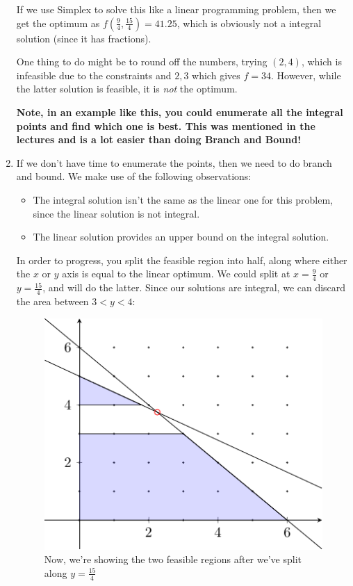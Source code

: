 \begin{enumerate}
  If we use Simplex to solve this like a linear programming problem, then we get
  the optimum as $f(\frac{9}{4}, \frac{15}{4}) = 41.25$, which is obviously not
  a integral solution (since it has fractions).

  One thing to do might be to round off the numbers, trying $(2,4)$, which is
  infeasible due to the constraints and $2,3$ which gives $f=34$. However, while
  the latter solution is feasible, it is \textit{not} the optimum.

  \textbf{Note, in an example like this, you could enumerate all the integral 
  points and find which one is best. This was mentioned in the lectures and is 
  a lot easier than doing Branch and Bound!}

  \item If we don't have time to enumerate the points, then we need to do 
  branch and bound. We make use of the following observations:
  
  \begin{itemize}
    \item The integral solution isn't the same as the linear one for this
      problem, since the linear solution is not integral.
    \item The linear solution provides an upper bound on the integral solution.
  \end{itemize}

  In order to progress, you split the feasible region into half, along where
  either the $x$ or $y$ axis is equal to the linear optimum. We could split at
  $x = \frac{9}{4}$ or $y = \frac{15}{4}$, and will do the latter. Since our
  solutions are integral, we can discard the area between $3 < y < 4$:

  \begin{figure}[H]
    \centering
    \includegraphics{diagrams/graph6}
    \caption{Now, we're showing the two feasible regions after we've split 
      along $y = \frac{15}{4}$}
    \label{fig:graph-6}
  \end{figure}


\end{enumerate}

